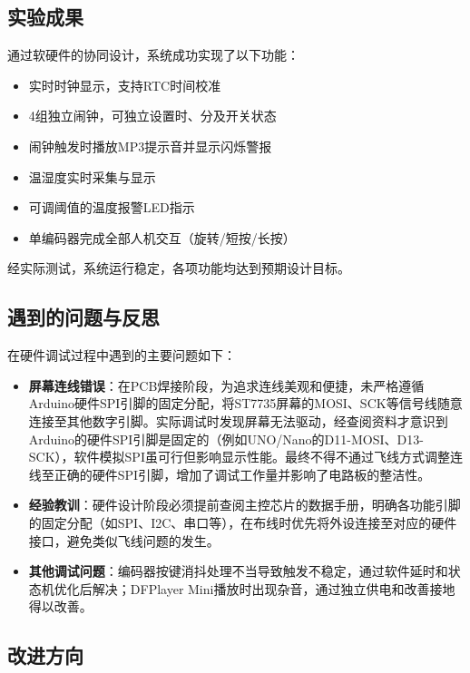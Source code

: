 \documentclass[12pt,a4paper]{article}
\begin{document}
\subsection*{实验成果}

通过软硬件的协同设计，系统成功实现了以下功能：
\begin{itemize}
    \item 实时时钟显示，支持RTC时间校准
    \item 4组独立闹钟，可独立设置时、分及开关状态
    \item 闹钟触发时播放MP3提示音并显示闪烁警报
    \item 温湿度实时采集与显示
    \item 可调阈值的温度报警LED指示
    \item 单编码器完成全部人机交互（旋转/短按/长按）
\end{itemize}

经实际测试，系统运行稳定，各项功能均达到预期设计目标。

\subsection*{遇到的问题与反思}

在硬件调试过程中遇到的主要问题如下：

\begin{itemize}
    \item \textbf{屏幕连线错误}：在PCB焊接阶段，为追求连线美观和便捷，未严格遵循Arduino硬件SPI引脚的固定分配，将ST7735屏幕的MOSI、SCK等信号线随意连接至其他数字引脚。实际调试时发现屏幕无法驱动，经查阅资料才意识到Arduino的硬件SPI引脚是固定的（例如UNO/Nano的D11-MOSI、D13-SCK），软件模拟SPI虽可行但影响显示性能。最终不得不通过飞线方式调整连线至正确的硬件SPI引脚，增加了调试工作量并影响了电路板的整洁性。
    
    \item \textbf{经验教训}：硬件设计阶段必须提前查阅主控芯片的数据手册，明确各功能引脚的固定分配（如SPI、I2C、串口等），在布线时优先将外设连接至对应的硬件接口，避免类似飞线问题的发生。
    
    \item \textbf{其他调试问题}：编码器按键消抖处理不当导致触发不稳定，通过软件延时和状态机优化后解决；DFPlayer Mini播放时出现杂音，通过独立供电和改善接地得以改善。
\end{itemize}

\subsection*{改进方向}
\end{document}
